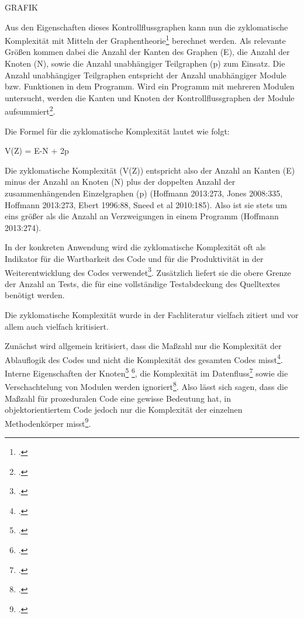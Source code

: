 GRAFIK

Aus den Eigenschaften dieses Kontrollflussgraphen kann nun die
zyklomatische Komplexität mit Mitteln der Graphentheorie\footcite[Vgl. ][]{(Hoffmann
  2013:273).} berechnet werden. Als relevante Größen kommen dabei die
Anzahl der Kanten des Graphen (E), die Anzahl der Knoten (N), sowie die
Anzahl unabhängiger Teilgraphen (p) zum Einsatz. Die Anzahl unabhängiger
Teilgraphen entspricht der Anzahl unabhängiger Module bzw. Funktionen in
dem Programm. Wird ein Programm mit mehreren Modulen untersucht, werden
die Kanten und Knoten der Kontrollflussgraphen der Module
aufsummiert\footcite[Vgl. ][]{(Hoffmann 2013:275f)}.

Die Formel für die zyklomatische Komplexität lautet wie folgt:

V(Z) = \textbar E\textbar-\textbar N\textbar{} + 2p

Die zyklomatische Komplexität (V(Z)) entspricht also der Anzahl an
Kanten (E) minus der Anzahl an Knoten (N) plus der doppelten Anzahl der
zusammenhängenden Einzelgraphen (p) (Hoffmann 2013:273, Jones 2008:335,
Hoffmann 2013:273, Ebert 1996:88, Sneed et al 2010:185). Also ist sie
stets um eins größer als die Anzahl an Verzweigungen in einem Programm
(Hoffmann 2013:274).

In der konkreten Anwendung wird die zyklomatische Komplexität oft als
Indikator für die Wartbarkeit des Code und für die Produktivität in der
Weiterentwicklung des Codes verwendet\footcite[Vgl. ][]{(Jones 2008:336)}.
Zusätzlich liefert sie die obere Grenze der Anzahl an Tests, die für
eine vollständige Testabdeckung des Quelltextes benötigt werden.

Die zyklomatische Komplexität wurde in der Fachliteratur vielfach
zitiert und vor allem auch vielfach kritisiert.

Zunächst wird allgemein kritisiert, dass die Maßzahl nur die Komplexität
der Ablauflogik des Codes und nicht die Komplexität des gesamten Codes
misst\footcite[Vgl. ][]{(Sneed et al 2010:186).}. Interne Eigenschaften der
Knoten\footcite[Vgl. ][]{(Hoffmann 2013:273).} \footcite[Vgl. ][]{(Rumreich and Kecskemety
  2019:2)}, die Komplexität im Datenfluss\footcite[Vgl. ][]{(Rumreich and
  Kecskemety 2019:2)} sowie die Verschachtelung von Modulen werden
ignoriert\footcite[Vgl. ][]{(Zuse S. 89ff).}. Also lässt sich sagen, dass die
Maßzahl für prozeduralen Code eine gewisse Bedeutung hat, in
objektorientiertem Code jedoch nur die Komplexität der einzelnen
Methodenkörper misst\footcite[Vgl. ][]{(Sneed et al 2010:186).}.

